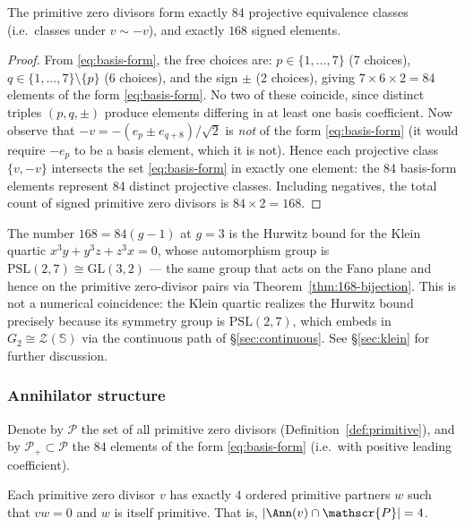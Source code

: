 \begin{proposition}\label{prop:census}
The primitive zero divisors form exactly $84$ projective equivalence
classes (i.e.\ classes under $v\sim -v$), and exactly $168$ signed
elements.
\end{proposition}

\begin{proof}
From \eqref{eq:basis-form}, the free choices are: $p\in\{1,\dots,7\}$ (7
choices), $q\in\{1,\dots,7\}\setminus\{p\}$ (6 choices), and the sign
$\pm$ (2 choices), giving $7\times 6\times 2 = 84$ elements of the form
\eqref{eq:basis-form}.  No two of these coincide, since distinct triples
$(p,q,\pm)$ produce elements differing in at least one basis coefficient.
Now observe that $-v = -(e_p \pm e_{q+8})/\sqrt{2}$ is \emph{not} of the
form \eqref{eq:basis-form} (it would require $-e_p$ to be a basis element,
which it is not).  Hence each projective class $\{v,-v\}$ intersects the
set \eqref{eq:basis-form} in exactly one element: the 84 basis-form
elements represent 84 distinct projective classes.  Including negatives,
the total count of signed primitive zero divisors is $84\times 2 = 168$.
\end{proof}

\begin{remark}\label{rem:hurwitz}
The number $168 = 84(g-1)$ at $g=3$ is the Hurwitz bound for the Klein
quartic $x^3y + y^3z + z^3x = 0$, whose automorphism group is
$\mathrm{PSL}(2,7)\cong\mathrm{GL}(3,2)$ --- the same group that acts on
the Fano plane and hence on the primitive zero-divisor pairs via
Theorem~\ref{thm:168-bijection}.  This is not a numerical coincidence: the
Klein quartic realizes the Hurwitz bound precisely because its
symmetry group is $\mathrm{PSL}(2,7)$, which embeds in $G_2\cong
\mathscr{Z}(\mathbb{S})$ via the continuous path of \S\ref{sec:continuous}.
See \S\ref{sec:klein} for further discussion.
\end{remark}


\subsubsection*{Annihilator structure}

Denote by $\mathscr{P}$ the set of all primitive zero divisors
(Definition~\ref{def:primitive}), and by $\mathscr{P}_+\subset\mathscr{P}$
the $84$ elements of the form \eqref{eq:basis-form} (i.e.\ with positive
leading coefficient).

\begin{proposition}
\label{prop:nullity}
Each primitive zero divisor $v$ has exactly $4$ ordered primitive partners
$w$ such that $vw = 0$ and $w$ is itself primitive.  That is,
$|\Ann(v)\cap\mathscr{P}| = 4$.
\end{proposition}

